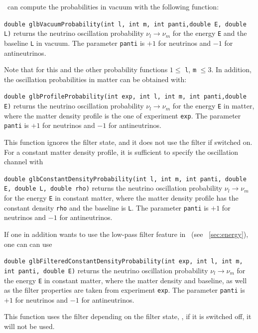 \GLOBES\ can compute the probabilities in vacuum
with the following function:
\begin{function}
{\tt double glbVacuumProbability(int l, int m, int panti,double E, double L)} returns the neutrino oscillation probability $\nu_l \rightarrow \nu_m$ for the energy {\tt E} and the baseline {\tt L} in vacuum. The parameter
{\tt panti} is $+1$ for neutrinos and $-1$ for antineutrinos. 
\end{function}
Note that for this and the other probability functions $1 \le$ {\tt l}, {\tt m} $\le 3$.
In addition, the oscillation probabilities in matter can be obtained
with:
\begin{function}
{\tt double glbProfileProbability(int exp, int l, int m, int panti,double E)} returns the neutrino oscillation probability $\nu_l \rightarrow \nu_m$ for the energy {\tt E} in matter, where the matter density profile
is the one of experiment {\tt exp}. The parameter
{\tt panti} is $+1$ for neutrinos and $-1$ for antineutrinos.
\end{function}
This function ignores the filter state, and it does not use the filter if switched on.
For a constant matter density profile, it is sufficient to specify the oscillation channel with
\begin{function}
{\tt double glbConstantDensityProbability(int l, int m, int panti, double E, double L, double rho)} returns the neutrino oscillation probability $\nu_l \rightarrow \nu_m$ for the energy {\tt E} in constant matter, where the matter density profile
has the constant density {\tt rho} and the baseline is {\tt L}. The parameter
{\tt panti} is $+1$ for neutrinos and $-1$ for antineutrinos.
\end{function}
If one in addition wants to use the low-pass filter feature in \GLOBES\ (see \Sec~\ref{sec:energy}), one can can use
\begin{function}
{\tt double glbFilteredConstantDensityProbability(int exp, int l, int m, int panti, double E)} returns the neutrino oscillation probability $\nu_l \rightarrow \nu_m$ for the energy {\tt E} in constant matter, where the matter density and baseline, as well as the filter properties are taken from experiment {\tt exp}. The parameter {\tt panti} is $+1$ for neutrinos and $-1$ for antineutrinos.
\end{function}
This function uses the filter depending on the filter state, \ie, if it is switched off, it will not be used.

